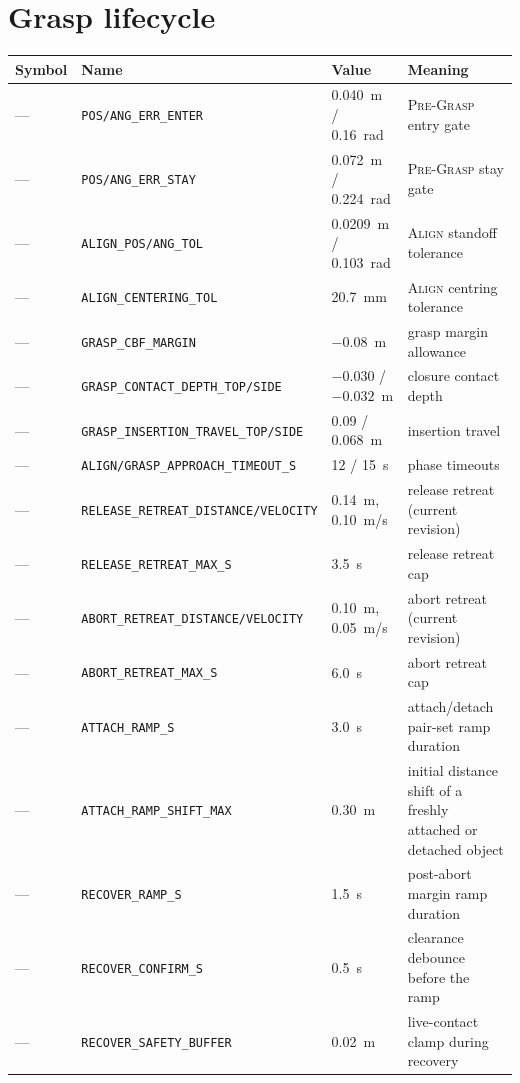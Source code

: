 \documentclass[12pt,a4paper,twoside,openright]{report}
\begin{document}
\section{Grasp lifecycle}
\begin{tabularx}{\linewidth}{@{}lllX@{}}
\toprule
Symbol & Name & Value & Meaning \\
\midrule
--- & \texttt{POS/ANG\_ERR\_ENTER} & 0.040~m / 0.16~rad & \textsc{Pre-Grasp} entry gate \\
--- & \texttt{POS/ANG\_ERR\_STAY} & 0.072~m / 0.224~rad & \textsc{Pre-Grasp} stay gate \\
--- & \texttt{ALIGN\_POS/ANG\_TOL} & 0.0209~m / 0.103~rad & \textsc{Align} standoff tolerance \\
--- & \texttt{ALIGN\_CENTERING\_TOL} & 20.7~mm & \textsc{Align} centring tolerance \\
--- & \texttt{GRASP\_CBF\_MARGIN} & $-0.08$~m & grasp margin allowance \\
--- & \texttt{GRASP\_CONTACT\_DEPTH\_TOP/SIDE} & $-0.030$ / $-0.032$~m & closure contact depth \\
--- & \texttt{GRASP\_INSERTION\_TRAVEL\_TOP/SIDE} & 0.09 / 0.068~m & insertion travel \\
--- & \texttt{ALIGN/GRASP\_APPROACH\_TIMEOUT\_S} & 12 / 15~s & phase timeouts \\
--- & \texttt{RELEASE\_RETREAT\_DISTANCE/VELOCITY} & 0.14~m, 0.10~m/s & release retreat (current revision) \\
--- & \texttt{RELEASE\_RETREAT\_MAX\_S} & 3.5~s & release retreat cap \\
--- & \texttt{ABORT\_RETREAT\_DISTANCE/VELOCITY} & 0.10~m, 0.05~m/s & abort retreat (current revision) \\
--- & \texttt{ABORT\_RETREAT\_MAX\_S} & 6.0~s & abort retreat cap \\
--- & \texttt{ATTACH\_RAMP\_S} & 3.0~s & attach/detach pair-set ramp duration \\
--- & \texttt{ATTACH\_RAMP\_SHIFT\_MAX} & 0.30~m & initial distance shift of a freshly attached or detached object \\
--- & \texttt{RECOVER\_RAMP\_S} & 1.5~s & post-abort margin ramp duration \\
--- & \texttt{RECOVER\_CONFIRM\_S} & 0.5~s & clearance debounce before the ramp \\
--- & \texttt{RECOVER\_SAFETY\_BUFFER} & 0.02~m & live-contact clamp during recovery \\
\bottomrule
\end{tabularx}
\end{document}
